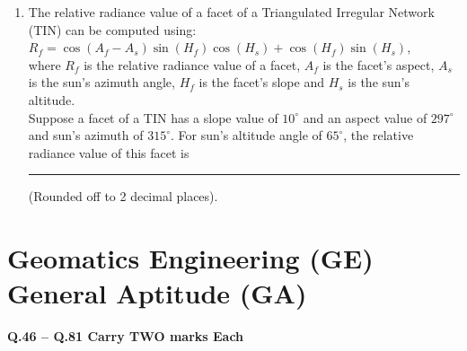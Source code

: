 \documentclass[journal,12pt,onecolumn]{IEEEtran}
\begin{document}
\begin{enumerate}
    \item The relative radiance value of a facet of a Triangulated Irregular Network (TIN) can be computed using: \\
    $R_f = \cos(A_f - A_s) \sin(H_f) \cos(H_s) + \cos(H_f) \sin(H_s)$, \\
    where $R_f$ is the relative radiance value of a facet, $A_f$ is the facet’s aspect, $A_s$ is the sun’s azimuth angle, $H_f$ is the facet’s slope and $H_s$ is the sun’s altitude. \\
    Suppose a facet of a TIN has a slope value of $10^\circ$ and an aspect value of $297^\circ$ and sun’s azimuth of $315^\circ$. For sun’s altitude angle of $65^\circ$, the relative radiance value of this facet is \rule{3cm}{0.15mm} (Rounded off to 2 decimal places).
\end{enumerate}

\section*{Geomatics Engineering (GE) \\ General Aptitude (GA)}

\textbf{Q.46 -- Q.81 Carry TWO marks Each}
\end{document}
